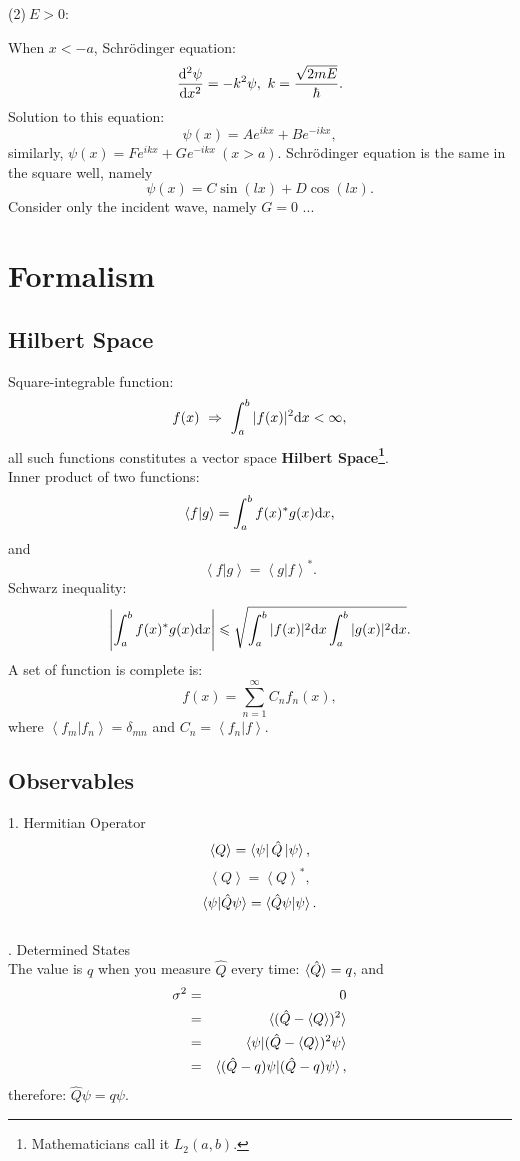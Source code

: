 \documentclass[12pt, 
]{article}
\begin{document}
\noindent (2)$~E>0$:

\noindent When $x<-a$, Schr\"odinger equation:
\[
	\frac{{\rm d}^2\psi}{{\rm d}x^2}=-k^2\psi, ~k=\frac{\sqrt{2mE}}{\hbar}.
\]
Solution to this equation:
\[
	\psi(x)=Ae^{ikx}+Be^{-ikx},
\]
similarly, $\psi(x)=Fe^{ikx}+Ge^{-ikx}~(x>a)$.
Schr\"odinger equation is the same in the square well, namely
\[
	\psi(x)=C\sin(lx)+D\cos(lx).
\]
Consider only the incident wave, namely $G=0$ ...
\newpage

\section{Formalism}
\subsection{Hilbert Space}
Square-integrable function:
\[
	f(x)~\Rightarrow~\int_a^b|f(x)|^2{\rm d}x<\infty,
\]
all such functions constitutes a vector space {\bf Hilbert Space\footnote{Mathematicians call it $L_2(a,b)$.}}.\\
Inner product of two functions:
\[
	\left<f|g\right>=\int_a^bf(x)^*g(x){\rm d}x,
\]
and
\[
	\left<f|g\right>=\left<g|f\right>^*.
\]
Schwarz inequality:
\begin{equation}\label{eq:14}
	\left|\int_a^bf(x)^*g(x){\rm d}x\right|\leqslant\sqrt{\int_a^b|f(x)|^2{\rm d}x\int_a^b|g(x)|^2{\rm d}x}.
\end{equation}
A set of function is complete is:
\[
	f(x)=\sum_{n=1}^\infty C_nf_n(x),
\]
where $\left<f_m|f_n\right>=\delta_{mn}$ and $C_n=\left<f_n|f\right>$.

\subsection{Observables}
1. Hermitian Operator
\[
	\left<Q\right>=\bra{\psi}\hat{Q}\ket{\psi},
\]
\[
	\left<Q\right>=\left<Q\right>^*,
\]
\[
	\braket{\psi|\hat{Q}\psi}=\braket{\hat{Q}\psi|\psi}.
\]
~\\

. Determined States\\
The value is $q$ when you measure $\hat{Q}$ every time: $\braket{\hat{Q}}=q$, and 
\begin{eqnarray*}
	\sigma^2&=&0\\
	&=&\braket{(\hat{Q}-\braket{Q})^2}\\
	&=&\braket{\psi|(\hat{Q}-\braket{Q})^2\psi}\\
	&=&\braket{(\hat{Q}-q)\psi|(\hat{Q}-q)\psi},
\end{eqnarray*}
therefore: $\hat{Q}\psi=q\psi$.
\end{document}
